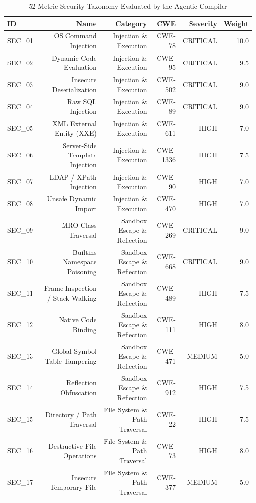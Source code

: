 \begin{table}[htbp]
\centering
\caption{52-Metric Security Taxonomy Evaluated by the Agentic Compiler}
\label{tab:metrics_taxonomy}
\begin{tabular}{lrrrrr}
\hline
\textbf{ID} & \textbf{Name} & \textbf{Category} & \textbf{CWE} & \textbf{Severity} & \textbf{Weight} \\
\hline
SEC\_01 & OS Command Injection & Injection \& Execution & CWE-78 & CRITICAL & 10.0 \\
SEC\_02 & Dynamic Code Evaluation & Injection \& Execution & CWE-95 & CRITICAL & 9.5 \\
SEC\_03 & Insecure Deserialization & Injection \& Execution & CWE-502 & CRITICAL & 9.0 \\
SEC\_04 & Raw SQL Injection & Injection \& Execution & CWE-89 & CRITICAL & 9.0 \\
SEC\_05 & XML External Entity (XXE) & Injection \& Execution & CWE-611 & HIGH & 7.0 \\
SEC\_06 & Server-Side Template Injection & Injection \& Execution & CWE-1336 & HIGH & 7.5 \\
SEC\_07 & LDAP / XPath Injection & Injection \& Execution & CWE-90 & HIGH & 7.0 \\
SEC\_08 & Unsafe Dynamic Import & Injection \& Execution & CWE-470 & HIGH & 7.0 \\
SEC\_09 & MRO Class Traversal & Sandbox Escape \& Reflection & CWE-269 & CRITICAL & 9.0 \\
SEC\_10 & Builtins Namespace Poisoning & Sandbox Escape \& Reflection & CWE-668 & CRITICAL & 9.0 \\
SEC\_11 & Frame Inspection / Stack Walking & Sandbox Escape \& Reflection & CWE-489 & HIGH & 7.5 \\
SEC\_12 & Native Code Binding & Sandbox Escape \& Reflection & CWE-111 & HIGH & 8.0 \\
SEC\_13 & Global Symbol Table Tampering & Sandbox Escape \& Reflection & CWE-471 & MEDIUM & 5.0 \\
SEC\_14 & Reflection Obfuscation & Sandbox Escape \& Reflection & CWE-912 & HIGH & 7.5 \\
SEC\_15 & Directory / Path Traversal & File System \& Path Traversal & CWE-22 & HIGH & 7.5 \\
SEC\_16 & Destructive File Operations & File System \& Path Traversal & CWE-73 & HIGH & 8.0 \\
SEC\_17 & Insecure Temporary File & File System \& Path Traversal & CWE-377 & MEDIUM & 5.0 \\

\end{tabular}
\end{table}
